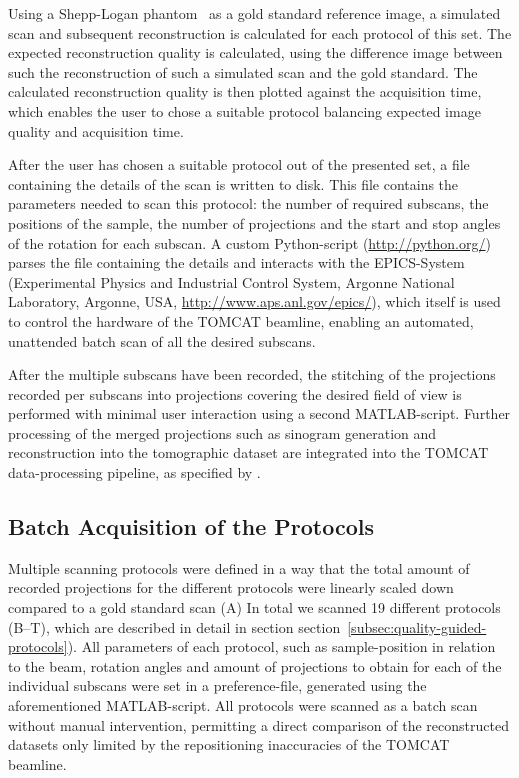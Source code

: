 Using a Shepp-Logan phantom~\cite{Shepp1974} as \cbstart a gold standard reference \cbend image, a simulated scan and subsequent reconstruction is calculated for each protocol of this set. The expected reconstruction quality is calculated, \cbstart using the difference image between such the reconstruction of such a simulated scan \cbend and the gold standard\cbdelete. The calculated reconstruction quality is then plotted against the acquisition time, which enables the user to chose a suitable protocol balancing expected image quality and acquisition time.

After the user has chosen a suitable protocol out of the presented set, a file containing the details of the scan is written to disk. This file contains the parameters needed to scan this protocol: the number of required subscans, the positions of the sample, the number of projections and the start and stop angles of the rotation for each subscan. A custom Python-script (\url{http://python.org/}) parses the file containing the details and interacts with the EPICS-System (Experimental Physics and Industrial Control System, Argonne National Laboratory, Argonne, USA, \url{http://www.aps.anl.gov/epics/}), which itself is used to control the hardware of the TOMCAT beamline, enabling an automated, unattended batch scan of all the desired subscans.

After the multiple subscans have been recorded, the stitching of the projections recorded per subscans into projections covering the desired field of view is performed with minimal user interaction using a second MATLAB-script. Further processing of the merged projections such as sinogram generation and reconstruction into the tomographic dataset are integrated into the TOMCAT data-processing pipeline, as specified by
\ifhtml
	\citet{Hintermueller2009}%
\else
\fi%
.

\subsection{Batch Acquisition of the Protocols}
Multiple scanning protocols were defined in a way that the total amount of recorded projections for the different protocols were linearly scaled down compared to a gold standard scan \cbstart (A) In total we scanned 19 different protocols (B--T), which are described in detail in section \cbend section~\ref{subsec:quality-guided-protocols}). All parameters of each protocol, such as sample-position in relation to the beam, rotation angles and amount of projections to obtain for each of the individual subscans were set in a preference-file, generated using the aforementioned MATLAB-script. All protocols \cbdelete were scanned as a batch scan without manual intervention, permitting a direct comparison of the reconstructed datasets only limited by the repositioning inaccuracies of the TOMCAT beamline.

